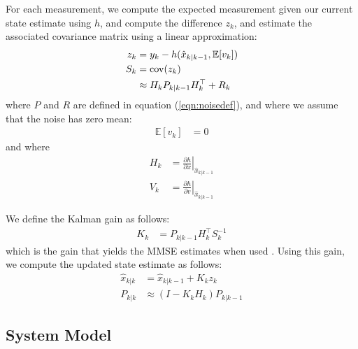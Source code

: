 \documentclass[]{article}
\begin{document}
{For each measurement, we compute the expected measurement given our current state estimate using $h$, and compute the difference $z_k$, and estimate the associated covariance matrix using a linear approximation:
\begin{align}
	z_k &= y_k - h(\hat{x}_{k|k-1}, \mathbb{E}[v_k]) \\
	S_k &= \operatorname{cov}(z_k) \notag \\
		&\approx H_k P_{k|k-1} H_k^\top + R_k
\end{align}
where $P$ and $R$ are defined in equation (\ref{eqn:noisedef}), and where we assume that the noise has zero mean:
\begin{align}
	\mathbb{E}[v_k] &= 0
\end{align}
and where
\begin{align}
	H_{k} &= \left . \frac{\partial h}{\partial x} \right \vert _{\hat{x}_{k|k-1}} \\
	V_{k} &= \left . \frac{\partial h}{\partial v} \right \vert _{\hat{x}_{k|k-1}}
\end{align}

We define the Kalman gain as follows:
\begin{align}
	K_k &= P_{k|k-1} H_k^\top S_k^{-1}
\end{align}
which is the gain that yields the MMSE estimates when used \cite{BerkelyCourse}. Using this gain, we compute the updated state estimate as follows:
\begin{align}
	\hat{x}_{k|k} 	&= \hat{x}_{k|k-1} + K_k z_k \\
	P_{k|k} 		&\approx (I - K_k H_k) P_{k|k-1}
\end{align}

\clearpage

\subsection{System Model} %
\label{sub:system_model}

}
\end{document}
